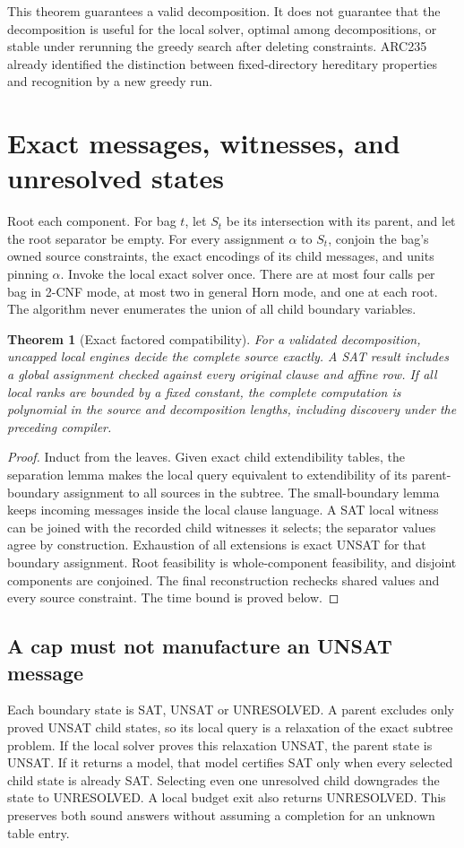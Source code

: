 \documentclass[11pt]{article}
\newtheorem{theorem}{Theorem}
\begin{document}
This theorem guarantees a valid decomposition. It does not guarantee that
the decomposition is useful for the local solver, optimal among decompositions,
or stable under rerunning the greedy search after deleting constraints.
ARC235 already identified the distinction between fixed-directory hereditary
properties and recognition by a new greedy run.

\section{Exact messages, witnesses, and unresolved states}
Root each component. For bag \(t\), let \(S_t\) be its intersection with
its parent, and let the root separator be empty. For every assignment
\(\alpha\) to \(S_t\), conjoin the bag's owned source constraints, the
exact encodings of its child messages, and units pinning \(\alpha\).
Invoke the local exact solver once. There are at most four calls per bag
in 2-CNF mode, at most two in general Horn mode, and one at each root.
The algorithm never enumerates the union of all child boundary variables.

\begin{theorem}[Exact factored compatibility]
For a validated decomposition, uncapped local engines decide the complete
source exactly. A SAT result includes a global assignment checked against
every original clause and affine row. If all local ranks are bounded by a
fixed constant, the complete computation is polynomial in the source and
decomposition lengths, including discovery under the preceding compiler.
\end{theorem}
\begin{proof}
Induct from the leaves. Given exact child extendibility tables, the separation
lemma makes the local query equivalent to extendibility of its parent-boundary
assignment to all sources in the subtree. The small-boundary lemma keeps
incoming messages inside the local clause language. A SAT local witness can
be joined with the recorded child witnesses it selects; the separator values
agree by construction. Exhaustion of all extensions is exact UNSAT for that
boundary assignment. Root feasibility is whole-component feasibility, and
disjoint components are conjoined. The final reconstruction rechecks shared
values and every source constraint. The time bound is proved below.
\end{proof}

\subsection*{A cap must not manufacture an UNSAT message}
Each boundary state is SAT, UNSAT or UNRESOLVED. A parent excludes only
proved UNSAT child states, so its local query is a relaxation of the exact
subtree problem. If the local solver proves this relaxation UNSAT, the parent
state is UNSAT. If it returns a model, that model certifies SAT only when
every selected child state is already SAT. Selecting even one unresolved
child downgrades the state to UNRESOLVED. A local budget exit also returns
UNRESOLVED. This preserves both sound answers without assuming a completion
for an unknown table entry.
\end{document}
